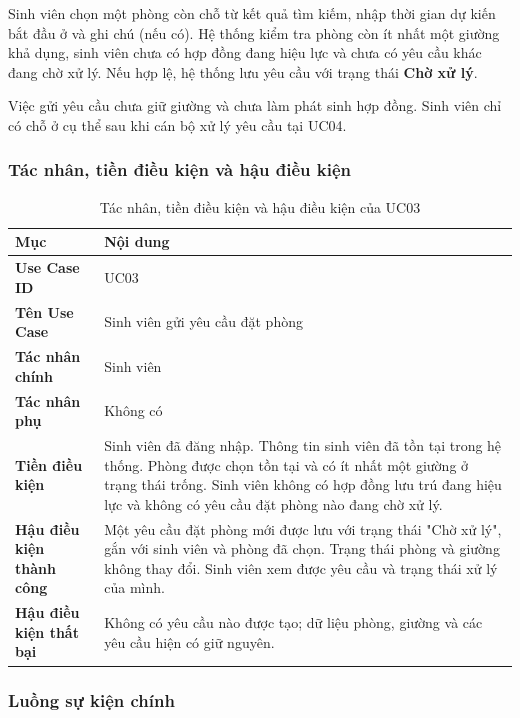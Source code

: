 Sinh viên chọn một phòng còn chỗ từ kết quả tìm kiếm, nhập thời gian dự kiến bắt đầu ở và ghi chú (nếu có). Hệ thống kiểm tra phòng còn ít nhất một giường khả dụng, sinh viên chưa có hợp đồng đang hiệu lực và chưa có yêu cầu khác đang chờ xử lý. Nếu hợp lệ, hệ thống lưu yêu cầu với trạng thái \textbf{Chờ xử lý}.

Việc gửi yêu cầu chưa giữ giường và chưa làm phát sinh hợp đồng. Sinh viên chỉ có chỗ ở cụ thể sau khi cán bộ xử lý yêu cầu tại UC04.

\subsubsection{Tác nhân, tiền điều kiện và hậu điều kiện}

\begin{table}[H]
\centering
\small
\caption{Tác nhân, tiền điều kiện và hậu điều kiện của UC03}
\label{tab:ch2-5}
\begin{tabularx}{\textwidth}{|>{\raggedright\arraybackslash}p{}|>{\raggedright\arraybackslash}X|}
\hline
\textbf{Mục} & \textbf{Nội dung} \\
\hline
\textbf{Use Case ID} & UC03 \\
\hline
\textbf{Tên Use Case} & Sinh viên gửi yêu cầu đặt phòng \\
\hline
\textbf{Tác nhân chính} & Sinh viên \\
\hline
\textbf{Tác nhân phụ} & Không có \\
\hline
\textbf{Tiền điều kiện} & Sinh viên đã đăng nhập. Thông tin sinh viên đã tồn tại trong hệ thống. Phòng được chọn tồn tại và có ít nhất một giường ở trạng thái trống. Sinh viên không có hợp đồng lưu trú đang hiệu lực và không có yêu cầu đặt phòng nào đang chờ xử lý. \\
\hline
\textbf{Hậu điều kiện thành công} & Một yêu cầu đặt phòng mới được lưu với trạng thái "Chờ xử lý", gắn với sinh viên và phòng đã chọn. Trạng thái phòng và giường không thay đổi. Sinh viên xem được yêu cầu và trạng thái xử lý của mình. \\
\hline
\textbf{Hậu điều kiện thất bại} & Không có yêu cầu nào được tạo; dữ liệu phòng, giường và các yêu cầu hiện có giữ nguyên. \\
\hline
\end{tabularx}
\end{table}

\subsubsection{Luồng sự kiện chính}

